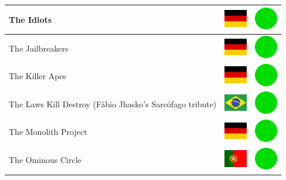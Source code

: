 \documentclass[12pt, a4paper, twoside]{report}
\begin{document}
\begin{center}
\begin{longtable}{|p{5cm}|p{2cm}|p{2cm}|}
 The Idiots                                                 & \includegraphics[width=1cm]{../4x3/de} &   \includegraphics[width=1cm]{../likes/y} \\ \hline
 The Jailbreakers                                           & \includegraphics[width=1cm]{../4x3/de} &   \includegraphics[width=1cm]{../likes/y} \\ \hline
 The Killer Apes                                            & \includegraphics[width=1cm]{../4x3/de} &   \includegraphics[width=1cm]{../likes/y} \\ \hline
 The Laws Kill Destroy (Fábio Jhasko's Sarcófago tribute)   & \includegraphics[width=1cm]{../4x3/br} &   \includegraphics[width=1cm]{../likes/y} \\ \hline
 The Monolith Project                                       & \includegraphics[width=1cm]{../4x3/de} &   \includegraphics[width=1cm]{../likes/y} \\ \hline
 The Ominous Circle                                         & \includegraphics[width=1cm]{../4x3/pt} &   \includegraphics[width=1cm]{../likes/y} \\ \hline

\end{longtable}
\end{center}
\end{document}
